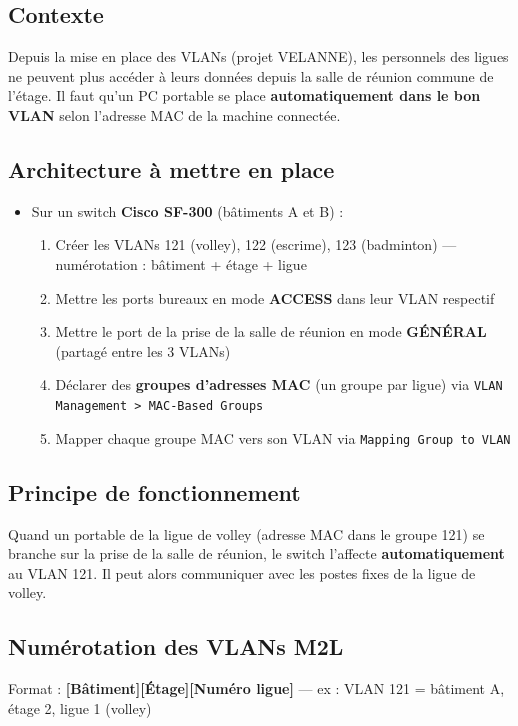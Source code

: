 \documentclass[a4paper,12pt]{article}
\begin{document}
\subsection{Contexte}
Depuis la mise en place des VLANs (projet VELANNE), les personnels des ligues ne peuvent plus accéder
à leurs données depuis la salle de réunion commune de l'étage. Il faut qu'un PC portable se place
\textbf{automatiquement dans le bon VLAN} selon l'adresse MAC de la machine connectée.

\subsection{Architecture à mettre en place}

\begin{itemize}[noitemsep]
    \item Sur un switch \textbf{Cisco SF-300} (bâtiments A et B) :
    \begin{enumerate}[noitemsep]
        \item Créer les VLANs 121 (volley), 122 (escrime), 123 (badminton) — numérotation : bâtiment + étage + ligue
        \item Mettre les ports bureaux en mode \textbf{ACCESS} dans leur VLAN respectif
        \item Mettre le port de la prise de la salle de réunion en mode \textbf{GÉNÉRAL} (partagé entre les 3 VLANs)
        \item Déclarer des \textbf{groupes d'adresses MAC} (un groupe par ligue) via \texttt{VLAN Management > MAC-Based Groups}
        \item Mapper chaque groupe MAC vers son VLAN via \texttt{Mapping Group to VLAN}
    \end{enumerate}
\end{itemize}

\subsection{Principe de fonctionnement}
Quand un portable de la ligue de volley (adresse MAC dans le groupe 121) se branche sur la prise
de la salle de réunion, le switch l'affecte \textbf{automatiquement} au VLAN 121.
Il peut alors communiquer avec les postes fixes de la ligue de volley.

\subsection{Numérotation des VLANs M2L}
Format : \textbf{[Bâtiment][Étage][Numéro ligue]} — ex : VLAN 121 = bâtiment A, étage 2, ligue 1 (volley)
\end{document}
